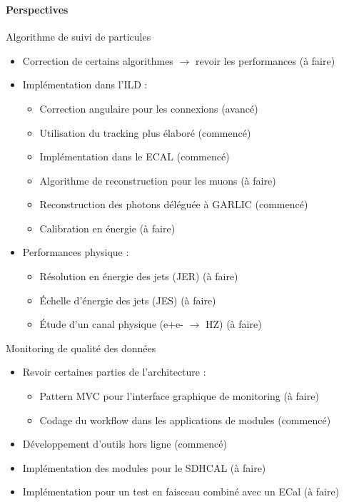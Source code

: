 \documentclass[8pt]{beamer}
\begin{document}
  \begin{frame}
  \frametitle{\secname}
  \framesubtitle{Perspectives}
    \begin{block}{Algorithme de suivi de particules}
      \begin{itemize}
        \item Correction de certains algorithmes $\rightarrow$ revoir les performances (à faire)
        \item Implémentation dans l'ILD :
        \begin{itemize}
          \item Correction angulaire pour les connexions (avancé)
          \item Utilisation du tracking plus élaboré (commencé)
          \item Implémentation dans le ECAL (commencé)
          \item Algorithme de reconstruction pour les muons (à faire)
          \item Reconstruction des photons déléguée à GARLIC (commencé)
          \item Calibration en énergie (à faire)
        \end{itemize}
        \item Performances physique :
        \begin{itemize}
          \item Résolution en énergie des jets (JER) (à faire)
          \item Échelle d'énergie des jets (JES) (à faire)
          \item Étude d'un canal physique (e+e- $\rightarrow$ HZ) (à faire)
        \end{itemize}
      \end{itemize}
    \end{block}
    \begin{block}{Monitoring de qualité des données}
      \begin{itemize}
        \item Revoir certaines parties de l'architecture :
        \begin{itemize}
          \item Pattern MVC pour l'interface graphique de monitoring (à faire)
          \item Codage du workflow dans les applications de modules (commencé)
        \end{itemize}
        \item Développement d'outils hors ligne (commencé)
        \item Implémentation des modules pour le SDHCAL (à faire)
        \item Implémentation pour un test en faisceau combiné avec un ECal (à faire)
      \end{itemize}
    \end{block}
  \end{frame}
\end{document}
